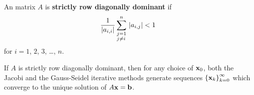 \begin{defn}
An \nn matrix $A$ is
{\bfseries strictly row diagonally dominant} if
\[
\frac{1}{|a_{i,i}|}
\sum_{\begin{subarray}{l} j=1 \\j \neq i \end{subarray}}^n \,
|a_{i,j}| < 1
\]
for $i=1$, $2$, $3$, \ldots , $n$.
\end{defn}

\begin{theorem}
If $A$ is strictly row diagonally dominant, then for any choice of
$\mathbf{x}_{0}$, both the Jacobi and the Gauss-Seidel iterative methods
generate sequences $\left\{\mathbf{x}_k\right\}_{k=0}^\infty$ which
converge to the unique solution of $A \mathbf{x} = \mathbf{b}$.
\label{convcond}
\end{theorem}

